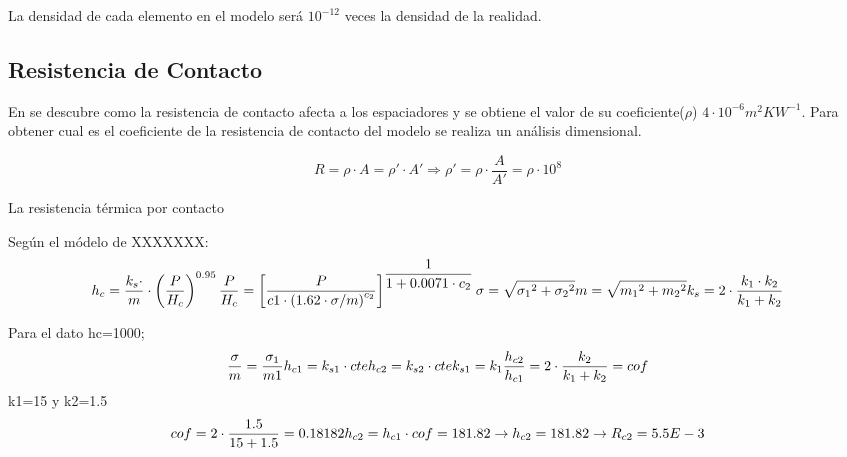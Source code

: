 La densidad de cada elemento en el modelo será $10^{-12}$ veces la densidad de la realidad.

\subsection{Resistencia de Contacto}
En \cite{noauthor_parallel-plate_nodate} se descubre como la resistencia de contacto afecta a los espaciadores y se obtiene el valor de su coeficiente($\rho$) $4\cdot 10^{-6}m^2 KW^{-1} $. Para obtener cual es el coeficiente de la resistencia de contacto del modelo se realiza un análisis dimensional.

\begin{equation}
	R= \rho \cdot A =\rho ' \cdot A' \Longrightarrow \rho '=\rho \cdot \dfrac{A}{A'}=\rho \cdot 10^8
\end{equation}

La resistencia térmica por contacto

Según el módelo de XXXXXXX:
\begin{equation}
	h_c=\dfrac{k_s\cdot}{m}\cdot \left( \dfrac{P}{H_c} \right)^{0.95} \\ \dfrac{P}{H_c} = \left[ \dfrac{P}{c1\cdot \left(1.62\cdot \sigma/m \right)^{c_2}}\right]^{\dfrac{1}{1+0.0071\cdot c_2}} \\	\sigma =\sqrt{{\sigma_1}^2+{\sigma_2}^2} \\ m=\sqrt{{m_1}^2+{m_2}^2}	\\ k_s=2\cdot \dfrac{k_1\cdot k_2}{k_1+k_2}
\end{equation}

Para el dato hc=1000;
\begin{equation}
	\dfrac{\sigma}{m}=\dfrac{\sigma_1}{m1}	\\ h_{c1}=k_{s1}\cdot cte \\ h_{c2}=k_{s2}\cdot cte	\\ k_{s1}=k_1 \\ \dfrac{h_{c2}}{h_{c1}}= 2\cdot \dfrac{k_2}{k_1+k_2}=cof
\end{equation}
k1=15 y k2=1.5
\begin{equation}
	cof=2\cdot \dfrac{1.5}{15+1.5}=0.18182
	\\ h_{c2}=h_{c1}\cdot cof=181.82 \rightarrow h_{c2}=181.82 \rightarrow R_{c2}=5.5E-3
\end{equation}